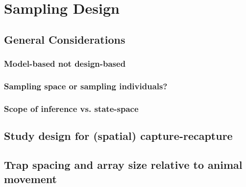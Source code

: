 \chapter{
Sampling Design
}
\label{chapt.design}

\section{General Considerations}


\subsection{Model-based not design-based}

\subsection{Sampling space or sampling individuals?}

\subsection{Scope of inference vs. state-space}


\section{Study design for (spatial) capture-recapture}



\section{Trap spacing and array size relative to animal movement}

 \begin{table}[ht]
  \centering
      \begin{tabular}{l*{7}{c}}
    \hline
   \hline
    
    \end{tabular}
  \label{design.tab.simres}
\end{table}


\begin{table}[ht]
  \centering
      \begin{tabular}{l p{2.1cm} p{2.3cm}p{2.1cm}p{2.3cm}}
    \hline
   
    \end{tabular}
  \label{design.tab.simdat}
\end{table}


